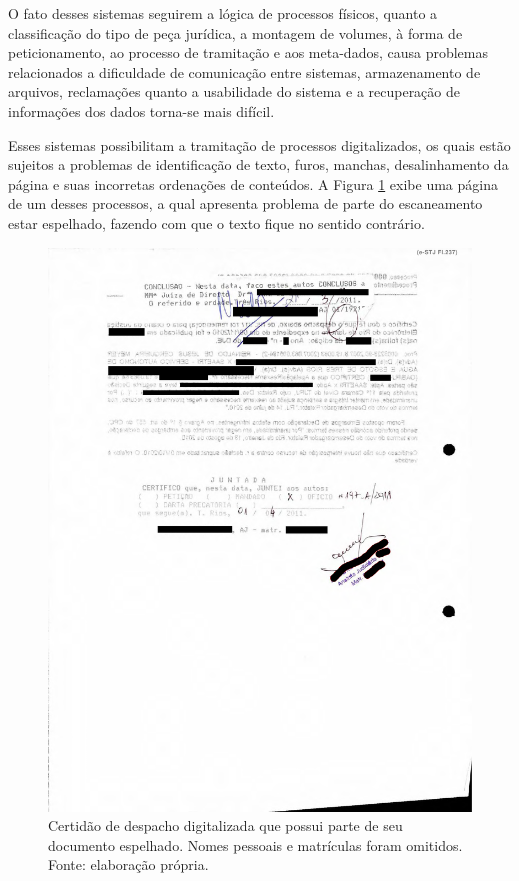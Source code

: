 O fato desses sistemas seguirem a lógica de processos físicos, quanto a classificação do tipo de peça jurídica, a montagem de volumes, à forma de peticionamento, ao processo de tramitação e aos meta-dados, causa problemas relacionados a dificuldade de comunicação entre sistemas, armazenamento de arquivos, reclamações quanto a usabilidade do sistema e a recuperação de informações dos dados torna-se mais difícil.

Esses sistemas possibilitam a tramitação de processos digitalizados, os quais estão sujeitos a problemas de identificação de texto, furos, manchas, desalinhamento da página e suas incorretas ordenações de conteúdos. A Figura \ref{fig:bad_scan} exibe uma página de um desses processos, a qual apresenta problema de parte do escaneamento estar espelhado, fazendo com que o texto fique no sentido contrário.

\begin{figure}[ht]
	\centering
		\includegraphics[keepaspectratio=true,scale=0.3]{figuras/badScan}
	\caption[Página escaneada dentro de um volume]{Certidão de despacho digitalizada que possui parte de seu documento espelhado. Nomes pessoais e matrículas foram omitidos. Fonte: elaboração própria.}
	\label{fig:bad_scan}

\end{figure}

